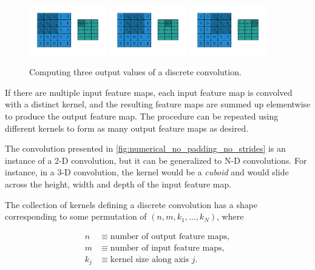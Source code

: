 \documentclass{article}
\begin{document}
\begin{figure}[t]
    \centering
    \includegraphics[width=0.3\textwidth]
        {pdf/numerical_no_padding_no_strides_00.pdf}
    \includegraphics[width=0.3\textwidth]
        {pdf/numerical_no_padding_no_strides_01.pdf}
    \includegraphics[width=0.3\textwidth]
        {pdf/numerical_no_padding_no_strides_02.pdf}
    \caption{\label{fig:numerical_no_padding_no_strides} Computing three output
        values of a discrete convolution.}
\end{figure}

If there are multiple input feature maps, each input feature map is convolved
with a distinct kernel, and the resulting feature maps are summed up elementwise
to produce the output feature map. The procedure can be repeated using different
kernels to form as many output feature maps as desired.

The convolution presented in \autoref{fig:numerical_no_padding_no_strides} is an
instance of a 2-D convolution, but it can be generalized to N-D convolutions.
For instance, in a 3-D convolution, the kernel would be a {\em cuboid} and would
slide across the height, width and depth of the input feature map.

The collection of kernels defining a discrete convolution has a shape
corresponding to some permutation of $(n, m, k_1, \ldots, k_N)$, where

\begin{equation}
\begin{split}
    n &\equiv \text{number of output feature maps},\\
    m &\equiv \text{number of input feature maps},\\
    k_j &\equiv \text{kernel size along axis $j$}.
\end{split}
\end{equation}
\end{document}

